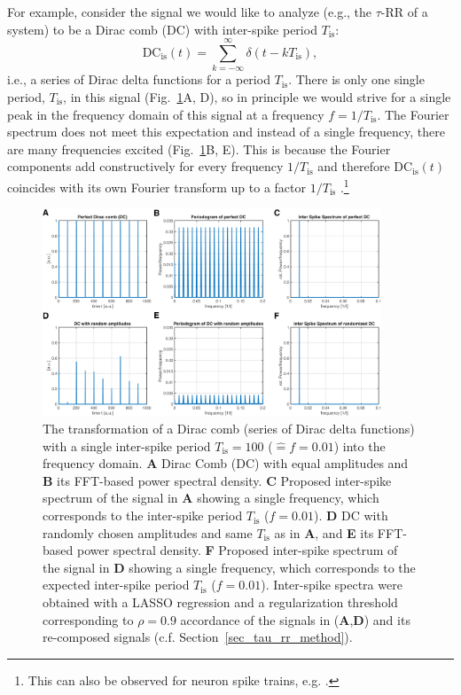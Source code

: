 \documentclass[entropy,article,submit,pdftex,moreauthors]{Definitions/mdpi}
\begin{document}
For example, consider the signal we would like to analyze 
(e.g., the $\tau$-RR of a system) to be a Dirac comb (DC) with inter-spike period $T_\text{is}$: 
\begin{equation}
\text{DC}_{\text{is}}(t) = \sum_{k=-\infty}^{\infty} \delta(t-kT_\text{is}),
\label{eq_dirac_comb}
\end{equation}
i.e., a series of Dirac delta functions for a period $T_\text{is}$. There is only one single period, $T_\text{is}$, in this signal (Fig.~\ref{fig_tau_rr_dirac_comb}A, D), so 
in principle we would strive for a single peak in the frequency domain of this signal at a frequency $f=1/T_\text{is}$. The Fourier spectrum does not meet this expectation 
and instead of a single frequency, there are many frequencies excited (Fig.~\ref{fig_tau_rr_dirac_comb}B, E). This is because the Fourier components add constructively 
for every frequency $1/T_\text{is}$ and therefore $\text{DC}_{\text{is}}(t)$ coincides with its own Fourier transform up to a factor $1/T_\text{is}$ \cite{Norden1998}.\footnote{This can also 
be observed for neuron spike trains, e.g. \cite{Orcioni2020,Biagetti2017}.}

\begin{figure}[h]
 \centering
 \includegraphics[width=0.9\textwidth]{./figures/fig_tau_rr_dirac_comb}
 \caption{The transformation of a Dirac comb (series of Dirac delta functions) with a single inter-spike period $T_{\text{is}}=100$ ($\widehat{=}f=0.01$) 
 into the frequency domain. 
 \textbf{A} Dirac Comb (DC) with equal amplitudes and
 \textbf{B} its FFT-based power spectral density.
 \textbf{C} Proposed inter-spike spectrum of the signal in \textbf{A} showing a single frequency, which corresponds to the inter-spike period $T_{\text{is}}$ ($f=0.01$).
 \textbf{D} DC with randomly chosen amplitudes and same $T_{\text{is}}$ as in \textbf{A}, and
 \textbf{E} its FFT-based power spectral density. 
 \textbf{F} Proposed inter-spike spectrum of the signal in \textbf{D} showing a single frequency, which corresponds to the expected inter-spike period $T_{\text{is}}$ ($f=0.01$). 
 Inter-spike spectra were obtained with a LASSO regression and a regularization threshold corresponding to $\rho=0.9$ accordance of the signals in (\textbf{A},\textbf{D}) and 
 its re-composed signals (c.f. Section~\ref{sec_tau_rr_method}). 
}
\label{fig_tau_rr_dirac_comb}
\end{figure}
\end{document}
